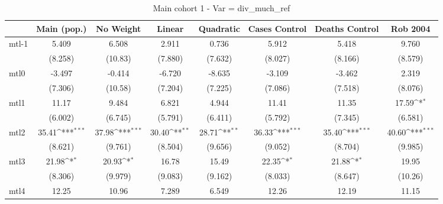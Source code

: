 \documentclass{article}
\begin{document}
{
\def\sym#1{\ifmmode^{#1}\else\(^{#1}\)\fi}
\begin{longtable}{l*{7}{c}}
\caption{Main cohort 1 - Var = div\_much\_ref}\\
\hline\hline\endfirsthead\hline\endhead\hline\endfoot\endlastfoot
                &\multicolumn{1}{c}{Main (pop.)}&\multicolumn{1}{c}{No Weight}&\multicolumn{1}{c}{Linear}&\multicolumn{1}{c}{Quadratic}&\multicolumn{1}{c}{Cases Control}&\multicolumn{1}{c}{Deaths Control}&\multicolumn{1}{c}{Rob 2004}\\
\hline
mtl-1           &    5.409         &    6.508         &    2.911         &    0.736         &    5.912         &    5.418         &    9.760         \\
                &  (8.258)         &  (10.83)         &  (7.880)         &  (7.632)         &  (8.027)         &  (8.166)         &  (8.579)         \\
mtl0            &   -3.497         &   -0.414         &   -6.720         &   -8.635         &   -3.109         &   -3.462         &    2.319         \\
                &  (7.306)         &  (10.58)         &  (7.204)         &  (7.225)         &  (7.086)         &  (7.518)         &  (8.076)         \\
mtl1            &    11.17         &    9.484         &    6.821         &    4.944         &    11.41         &    11.35         &    17.59\sym{*}  \\
                &  (6.002)         &  (6.745)         &  (5.791)         &  (6.411)         &  (5.792)         &  (7.345)         &  (6.581)         \\
mtl2            &    35.41\sym{***}&    37.98\sym{***}&    30.40\sym{**} &    28.71\sym{**} &    36.33\sym{***}&    35.40\sym{***}&    40.60\sym{***}\\
                &  (8.621)         &  (9.761)         &  (8.504)         &  (9.656)         &  (9.052)         &  (8.704)         &  (9.985)         \\
mtl3            &    21.98\sym{*}  &    20.93\sym{*}  &    16.78         &    15.49         &    22.35\sym{*}  &    21.88\sym{*}  &    19.95         \\
                &  (8.306)         &  (9.979)         &  (9.083)         &  (9.162)         &  (8.033)         &  (8.647)         &  (10.26)         \\
mtl4            &    12.25         &    10.96         &    7.289         &    6.549         &    12.26         &    12.19         &    11.15         \\

\end{longtable}}
\end{document}

